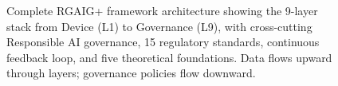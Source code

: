 \begin{figure}[!htbp]
{%
}%
\caption[One-Page RGAIG+ Framework Architecture]{Complete RGAIG+ framework architecture showing the 9-layer stack from Device (L1) to Governance (L9), with cross-cutting Responsible AI governance, 15 regulatory standards, continuous feedback loop, and five theoretical foundations. Data flows upward through layers; governance policies flow downward.}
\label{fig:rgaig_one_page_framework}
\end{figure}

\clearpage
